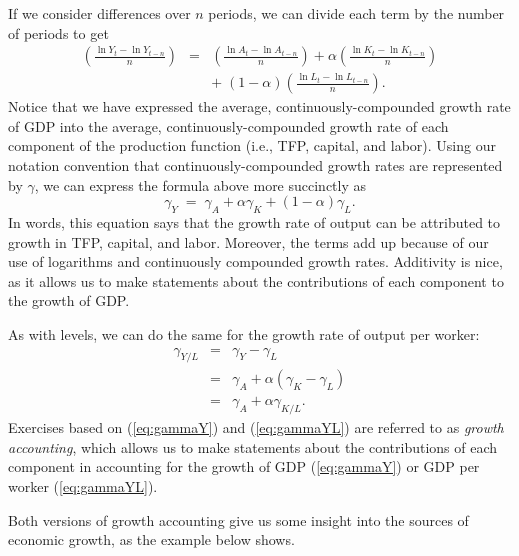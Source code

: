 If we consider differences over $n$ periods, we can divide each term by the number of periods to get
\begin{eqnarray*}
    \left( \frac{ \ln Y_{t} - \ln Y_{t-n} }{n} \right) &=&
                    \left( \frac{\ln A_{t} - \ln A_{t-n}} {n} \right)
                    + \alpha \left( \frac{ \ln K_{t} - \ln K_{t-n}} {n} \right) \\
        && + \; (1-\alpha) \left( \frac{\ln L_{t} - \ln L_{t-n}} {n} \right).
\end{eqnarray*}
Notice that we have expressed the average, continuously-compounded   growth rate of GDP into the average, continuously-compounded growth rate of each component of the production function (i.e., TFP, capital, and labor). Using our notation convention that continuously-compounded   growth rates are represented by $\gamma$,
we can express the formula above more succinctly as
\begin{equation}
    \gamma_Y \;=\; \gamma_A + \alpha \gamma_K + (1-\alpha) \gamma_L.
    \label{eq:gammaY}
\end{equation}
In words, this equation says that the growth rate of output can be attributed to growth in TFP, capital, and labor. Moreover, the terms add up because of our use of logarithms and continuously compounded growth rates. Additivity is nice, as it allows us to make statements about the contributions of each component to the growth of GDP.

As with levels, we can do the same for the growth rate of output per worker:
\begin{eqnarray}
    \gamma_{Y/L} &=& \gamma_Y - \gamma_L \nonumber \\
            &=&  \gamma_A + \alpha (\gamma_K - \gamma_L) \nonumber \\
        &=& \gamma_A + \alpha \gamma_{K/L} .
    \label{eq:gammaYL}
\end{eqnarray}
Exercises based on (\ref{eq:gammaY}) and (\ref{eq:gammaYL}) are referred to as
{\it growth accounting\/}, which allows us to make statements about the contributions of each component in accounting
 for the growth of GDP (\ref{eq:gammaY}) or GDP per worker (\ref{eq:gammaYL}).

Both versions of growth accounting
 give us some insight into the sources of economic
growth, as the example below shows.


